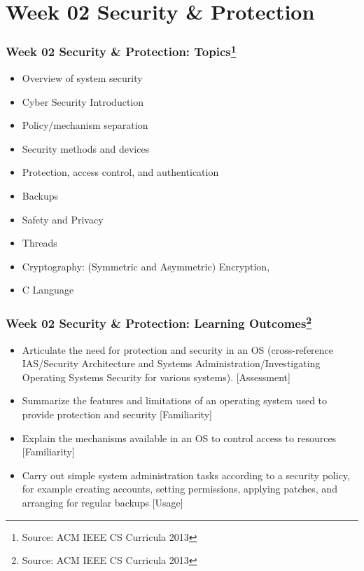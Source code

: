 
\section{Week 02 Security \& Protection}
\begin{frame}[fragile]
\frametitle{Week 02 Security \& Protection:
Topics\footnote{Source: ACM IEEE CS Curricula 2013}}

\begin{itemize}
\item Overview of system security 
\item Cyber Security Introduction
\item Policy/mechanism separation 
\item Security methods and devices 
\item Protection, access control, and authentication 
\item Backups 
\item Safety and Privacy
\item Threads
\item Cryptography: (Symmetric and Asymmetric) Encryption,
\item C Language
\end{itemize}

\end{frame}

\begin{frame}[fragile]
\frametitle{Week 02 Security \& Protection:
Learning Outcomes\footnote{Source: ACM IEEE CS Curricula 2013}}

\begin{itemize}
\item Articulate the need for protection and security in an OS (cross-reference IAS/Security Architecture and Systems Administration/Investigating Operating Systems Security for various systems). [Assessment]
\item Summarize the features and limitations of an operating system used to provide protection and security [Familiarity] 
\item Explain the mechanisms available in an OS to control access to resources [Familiarity] 
\item Carry out simple system administration tasks according to a security policy, for example creating accounts, setting permissions, applying patches, and arranging for regular backups [Usage] 
\end{itemize}
\end{frame}


